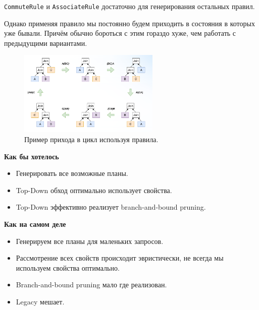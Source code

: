 \documentclass[11pt]{article}
\begin{document}
    \texttt{CommuteRule} и \texttt{AssociateRule} достаточно для генерирования остальных правил.

    Однако применяя правило мы постоянно будем приходить в состояния в которых уже бывали.
    Причём обычно бороться с этим гораздо хуже, чем работать с предыдущими вариантами.
    
    \begin{figure}[h!]
        \centering
        \includegraphics[width=0.6\textwidth]{Pictures/Rules/Циклы}
        \caption{Пример прихода в цикл используя правила.}
    \end{figure}
    
    \textbf{Как бы хотелось}
    \begin{itemize}
        \item Генерировать все возможные планы.
        \item Top-Down обход оптимально использует свойства.
        \item Top-Down эффективно реализует branch-and-bound pruning.
    \end{itemize}
    
    \textbf{Как на самом деле}
    \begin{itemize}
        \item Генерируем все планы для маленьких запросов.
        \item Рассмотрение всех свойств происходит эвристически, не всегда мы используем свойства оптимально.
        \item Branch-and-bound pruning мало где реализован.
        \item Legacy мешает.
    \end{itemize}
\end{document}
